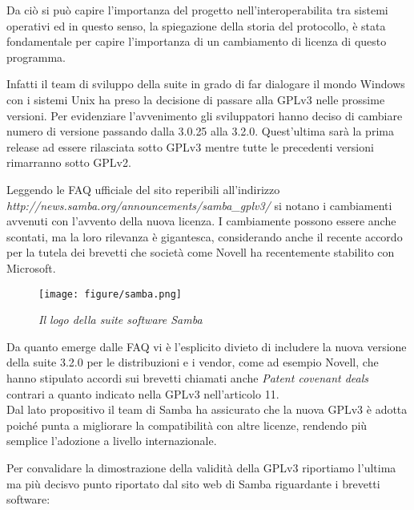 Da ciò si può capire l'importanza del progetto nell'interoperabilita tra sistemi operativi ed in questo senso, la spiegazione della storia del protocollo, è stata fondamentale per capire l'importanza di un cambiamento di licenza di questo programma.

Infatti il team di sviluppo della suite in grado di far dialogare il mondo Windows con i sistemi Unix ha preso la decisione di passare alla GPLv3 nelle prossime versioni.
Per evidenziare l’avvenimento gli sviluppatori hanno deciso di cambiare numero di versione passando dalla 3.0.25 alla 3.2.0.
Quest’ultima sarà la prima release ad essere rilasciata sotto GPLv3 mentre tutte le precedenti versioni rimarranno sotto GPLv2.

Leggendo le FAQ ufficiale del sito reperibili all'indirizzo \\ \textit{http://news.samba.org/announcements/samba\_gplv3/} si notano i cambiamenti avvenuti con l'avvento della nuova licenza. I cambiamente possono essere anche scontati, ma la loro rilevanza è gigantesca, considerando anche il recente accordo per la tutela dei brevetti che società come Novell ha recentemente stabilito con Microsoft.


\begin{figure}[h]
	\begin{center}
		\texttt{[image: figure/samba.png]}
	\end{center}
	\caption{\textit{Il logo della suite software Samba}}
\end{figure}

Da quanto emerge dalle FAQ vi è l’esplicito divieto di includere la nuova versione della suite 3.2.0 per le distribuzioni e i vendor, come ad esempio Novell, che hanno stipulato accordi sui brevetti chiamati anche \textit{Patent covenant deals} contrari a quanto indicato nella GPLv3 nell'articolo 11.\\
Dal lato propositivo il team di Samba ha assicurato che la nuova GPLv3 è adotta poiché punta a migliorare la compatibilità con altre licenze, rendendo più semplice l'adozione a livello internazionale.

\newpage

Per convalidare la dimostrazione della validità della GPLv3 riportiamo l'ultima ma più decisvo punto riportato dal sito web di Samba riguardante i brevetti software:\\





